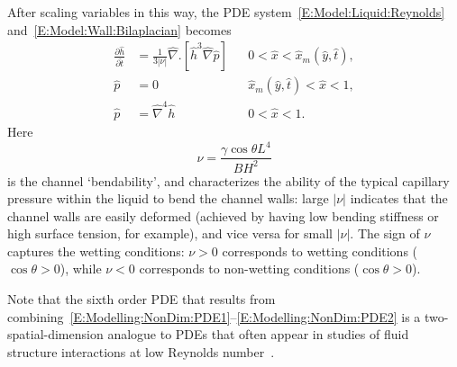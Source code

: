 \documentclass{jfm}
\newcommand{\ddp}[2]{\frac{\partial #1}{\partial #2}}
\newcommand{\bendability}{\nu}
\begin{document}
After scaling variables in this way, the PDE system~\eqref{E:Model:Liquid:Reynolds} and~\eqref{E:Model:Wall:Bilaplacian} becomes
\begin{align}
\ddp{\hat{h}}{\hat{t}} &=\frac{1}{3|\nu|}\hat{\nabla}. \left[\hat{h}^3\hat{\nabla}\hat{p}  \right] & & 0 <  \hat{x} < \hat{x}_m(\hat{y},\hat{t}),\label{E:Modelling:NonDim:PDE1}\\
  \hat{p}&=0 & &
\hat{x}_m(\hat{y},\hat{t}) < \hat{x} < 1,\label{E:Modelling:NonDim:PDE2}\\
\hat{p} &=\hat{\nabla}^4 \hat{h}& &0 < \hat{x} < 1.\label{E:Modelling:NonDim:PDE3}
\end{align}
Here
\begin{equation}\label{E:Modelling:NonDim:Bendability}
\bendability = \frac{\gamma \cos \theta L^4}{B H^2}
\end{equation}
is the channel `bendability', and characterizes the ability of the typical capillary pressure within the liquid to bend the channel walls: large $|\nu|$ indicates that the channel walls are easily deformed (achieved by having low bending stiffness or high surface tension, for example), and vice versa for small $|\nu|$. The sign of $\nu$ captures the wetting conditions: $\nu > 0$ corresponds to wetting conditions ($\cos \theta >0$), while $\nu < 0$ corresponds to non-wetting conditions ($\cos \theta >0$).

Note that the sixth order PDE that results from combining~\eqref{E:Modelling:NonDim:PDE1}--\eqref{E:Modelling:NonDim:PDE2} is a two-spatial-dimension analogue to PDEs that often appear in studies of fluid structure interactions at low Reynolds number~\citep[see][for example]{Flitton2004EJApplMech, Duprat2011JFM, Aristoff2011IntJNonlinMech}.
\end{document}
